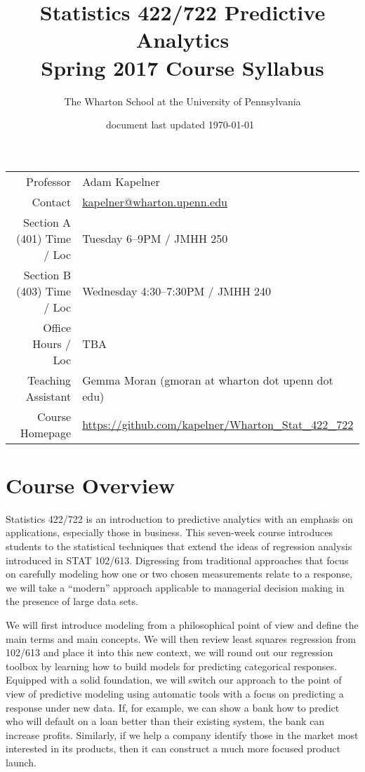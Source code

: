 \documentclass[12pt]{article}
\title{Statistics 422/722 Predictive Analytics \\ Spring 2017 Course Syllabus}
\author{The Wharton School at the University of Pennsylvania}
\date{\small document last updated \today ~\currenttime }
\begin{document}
\maketitle

\begin{table}[htp]
\centering
\begin{tabular}{rl}
Professor &  Adam Kapelner \\
Contact & \url{kapelner@wharton.upenn.edu} \\
Section A (401) Time / Loc & Tuesday 6--9PM / JMHH 250 \\
Section B (403) Time / Loc & Wednesday 4:30--7:30PM / JMHH 240 \\
Office Hours / Loc & TBA \\
Teaching Assistant & Gemma Moran (gmoran at wharton dot upenn dot edu)  \\
Course Homepage & \href{https://github.com/kapelner/Wharton_Stat_422_722}{https://github.com/kapelner/Wharton\_Stat\_422\_722} \\
\end{tabular}
\end{table}

\section*{Course Overview} 

Statistics 422/722 is an introduction to predictive analytics with an emphasis on applications, especially those in business. This seven-week course introduces students to the statistical techniques that extend the ideas of regression analysis introduced in STAT 102/613. Digressing from traditional approaches that focus on carefully modeling how one or two chosen measurements relate to a response, we will take a ``modern'' approach applicable to managerial decision making in the presence of large data sets.  

We will first introduce modeling from a philosophical point of view and define the main terms and main concepts. We will then review least squares regression from 102/613 and place it into this new context, we will round out our regression toolbox by learning how to build models for predicting categorical responses. Equipped with a solid foundation, we will switch our approach to the point of view of predictive modeling using automatic tools with a focus on predicting a response under new data. If, for example, we can show a bank how to predict who will default on a loan better than their existing system, the bank can increase profits. Similarly, if we help a company identify those in the market most interested in its products, then it can construct a much more focused product launch.
\end{document}
